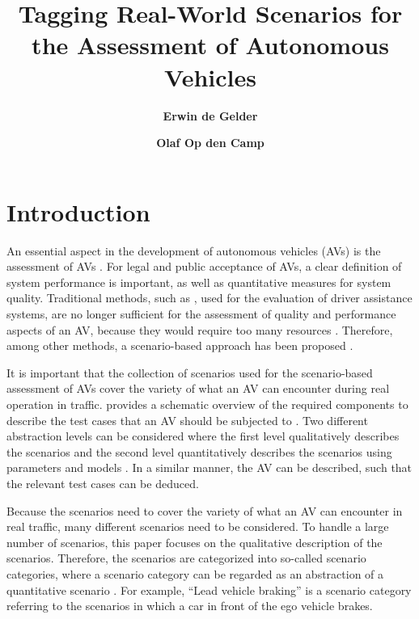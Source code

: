 \documentclass[twoside,twocolumn,9pt]{extarticle}
\title{Tagging Real-World Scenarios for the Assessment of Autonomous Vehicles} %
\author[1,2]{\large\bfseries Erwin de Gelder}
\author[1]{\large\bfseries Olaf Op den Camp}
\affil[1]{\normalsize\textit{TNO, Integrated Vehicle Safety, Helmond, The Netherlands (E-mail: erwin.degelder@tno.nl, olaf.opdencamp@tno.nl)}}
\affil[2]{\normalsize\textit{Delft University of Technology, Delft Center for Systems and Control, Delft, The Netherlands}}
\date{} %
\theoremstyle{plain}
\begin{document}
\maketitle


\section{Introduction}
\label{sec:introduction}

An essential aspect in the development of autonomous vehicles (AVs) is the assessment of AVs \autocite{bengler2014threedecades, stellet2015taxonomy, Helmer2017safety, putz2017pegasus, roesener2017comprehensive, gietelink2006development, wachenfeld2016release}.
For legal and public acceptance of AVs, a clear definition of system performance is important, as well as quantitative measures for system quality. 
Traditional methods, such as \autocite{response2006code, ISO26262}, used for the evaluation of driver assistance systems, are no longer sufficient for the assessment of quality and performance aspects of an AV, because they would require too many resources \autocite{wachenfeld2016release}. 
Therefore, among other methods, a scenario-based approach has been proposed \autocite{elrofai2018scenario, putz2017pegasus}. 

It is important that the collection of scenarios used for the scenario-based assessment of AVs cover the variety of what an AV can encounter during real operation in traffic. 
 provides a schematic overview of the required components to describe the test cases that an AV should be subjected to \autocite{elrofai2018scenario}. 
Two different abstraction levels can be considered where the first level qualitatively describes the scenarios and the second level quantitatively describes the scenarios using parameters and models \autocite{degelder2020ontology}. In a similar manner, the AV can be described, such that the relevant test cases can be deduced. 

Because the scenarios need to cover the variety of what an AV can encounter in real traffic, many different scenarios need to be considered. To handle a large number of scenarios, this paper focuses on the qualitative description of the scenarios. Therefore, the scenarios are categorized into so-called scenario categories, where a scenario category can be regarded as an abstraction of a quantitative scenario \autocite{degelder2020ontology}. For example, ``Lead vehicle braking'' is a scenario category referring to the scenarios in which a car in front of the ego vehicle brakes. 
\end{document}
